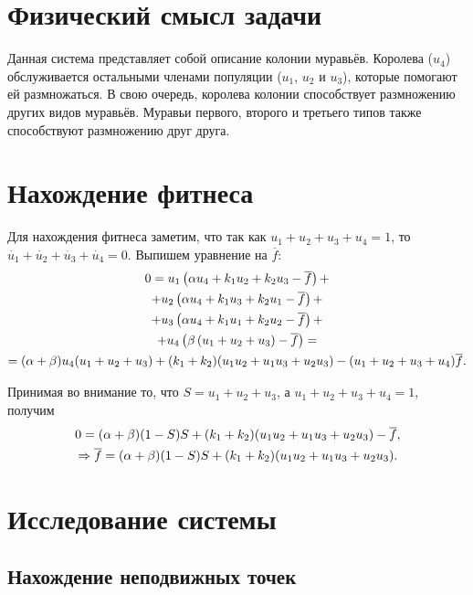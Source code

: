 \documentclass[12pt]{article}
\theoremstyle{rusdef}
\begin{document}
	\section{Физический смысл задачи}
	
	Данная система представляет собой описание колонии муравьёв. Королева ($u_4$) обслуживается остальными членами популяции ($u_1$, $u_2$ и $u_3$), которые помогают ей размножаться. В свою очередь, королева колонии способствует размножению других видов муравьёв. Муравьи первого, второго и третьего типов также способствуют размножению друг друга.
	
	\section{Нахождение фитнеса}
	
	Для нахождения фитнеса заметим, что так как $u_1 + u_2 + u_3 + u_4 = 1$, то $\dot{u_1} + \dot{u_2} + \dot{u_3} + \dot{u_4} = 0$. Выпишем уравнение на $\overline{f}$:
	\begin{gather}
	0 = u_1 \left( \alpha u_4 + k_1 u_2 + k_2 u_3 - \overline{f} \right) + \notag \\
	+ u_2 \left( \alpha u_4 + k_1 u_3 + k_2 u_1 - \overline{f} \right) + \notag \\
	+ u_3 \left( \alpha u_4 + k_1 u_1 + k_2 u_2 - \overline{f} \right) + \notag \\
	+ u_4 \left( \beta \left( u_1 + u_2 + u_3 \right) - \overline{f} \right) = \notag \\
	= (\alpha + \beta) u_4 (u_1 + u_2 + u_3) + (k_1 + k_2) (u_1 u_2 + u_1 u_3 + u_2 u_3) - (u_1 + u_2 + u_3 + u_4) \overline{f}. \notag
	\end{gather}
	
	Принимая во внимание то, что $S = u_1 + u_2 + u_3$, а $u_1 + u_2 + u_3 + u_4 = 1$, получим
	\begin{gather}
	0 = (\alpha + \beta) (1 - S) S + (k_1 + k_2) (u_1 u_2 + u_1 u_3 + u_2 u_3) - \overline{f}, \notag \\
	\Rightarrow \overline{f} = (\alpha + \beta) (1 - S) S + (k_1 + k_2) (u_1 u_2 + u_1 u_3 + u_2 u_3). \notag
	\end{gather}
	
	\section{Исследование системы}
	\subsection{Нахождение неподвижных точек}
	
\end{document}
